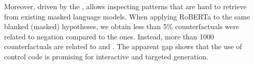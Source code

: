 Moreover, driven by the \tagstrs, \sysname allows inspecting patterns that are hard to retrieve from existing masked language models.
When applying RoBERTa to the same blanked (masked) hypotheses, we obtain less than 5\% counterfactuals were related to negation compared to the \sysname ones.
Instead, more than 1000 counterfactuals are related to \texttt{} and \texttt{}.
The apparent gap shows that the use of control code is promising for interactive and targeted generation.

